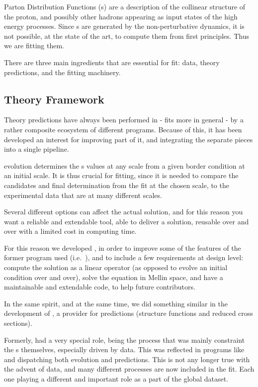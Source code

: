 Parton Distribution Functions (\pdf{}s) are a description of the collinear
structure of the proton, and possibly other hadrons appearing as input states
of the high energy processes.
Since \pdf{}s are generated by the non-perturbative \qcd{} dynamics, it is not
possible, at the state of the art, to compute them from first principles. Thus
we are fitting them.

There are three main ingredients that are essential for \pdf{} fit: data,
theory predictions, and the fitting machinery.

\subsection*{Theory Framework}

Theory predictions have always been performed in \nnpdf{} - \pdf{} fits more in
general - by a rather composite ecosystem of different programs. Because of
this, it has been developed an interest for improving part of it, and
integrating the separate pieces into a single pipeline.

\dglap{} evolution determines the \pdf{}s values at any scale from a given
border condition at an initial scale.
It is thus crucial for fitting, since it is needed to compare the candidates
and final determination from the fit at the chosen scale, to the experimental
data that are at many different scales.

Several different options can affect the actual \dglap{} solution, and for this
reason you want a reliable and extendable tool, able to deliver a solution,
reusable over and over with a limited cost in computing time.

For this reason we developed \textbf{\eko{}}
, in order
to improve some of the features of the former program used (i.e.\ \apfel{}),
and to include a few requirements at design level: compute the solution as a
linear operator (as opposed to evolve an initial condition over and over),
solve the equation in Mellin space, and have a maintainable and extendable
code, to help future contributors.

In the same spirit, and at the same time, we did something similar in the
development of \textbf{\yadism{}} , a
provider for \dis{} predictions (structure functions and reduced cross
sections).

Formerly, \dis{} had a very special role, being the process that was mainly
constraint the \pdf{}s themselves, especially driven by \hera{} data.
This was reflected in programs like \apfel{} and \qcdnum{} dispatching both
evolution and \dis{} predictions.
This is not any longer true with the advent of \lhc{} data, and many different
processes are now included in the fit. Each one playing a different and
important role as a part of the global dataset.

